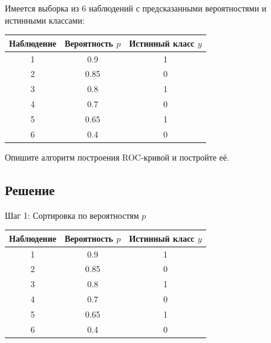 Имеется выборка из 6 наблюдений с предсказанными вероятностями и истинными классами:

\begin{table}[h!]
    \centering
    \begin{tabular}{|c|c|c|}
        \hline
        \textbf{Наблюдение} & \textbf{Вероятность $p$} & \textbf{Истинный класс $y$} \\
        \hline
        1                   & 0.9                      & 1                           \\
        2                   & 0.85                     & 0                           \\
        3                   & 0.8                      & 1                           \\
        4                   & 0.7                      & 0                           \\
        5                   & 0.65                     & 1                           \\
        6                   & 0.4                      & 0                           \\
        \hline
    \end{tabular}
\end{table}

Опишите алгоритм построения ROC-кривой и постройте её.

\subsection*{Решение}

Шаг 1: Сортировка по вероятностям $p$

\begin{table}[h!]
    \centering
    \begin{tabular}{|c|c|c|}
        \hline
        \textbf{Наблюдение} & \textbf{Вероятность $p$} & \textbf{Истинный класс $y$} \\
        \hline
        1                   & 0.9                      & 1                           \\
        2                   & 0.85                     & 0                           \\
        3                   & 0.8                      & 1                           \\
        4                   & 0.7                      & 0                           \\
        5                   & 0.65                     & 1                           \\
        6                   & 0.4                      & 0                           \\
        \hline
    \end{tabular}
\end{table}


